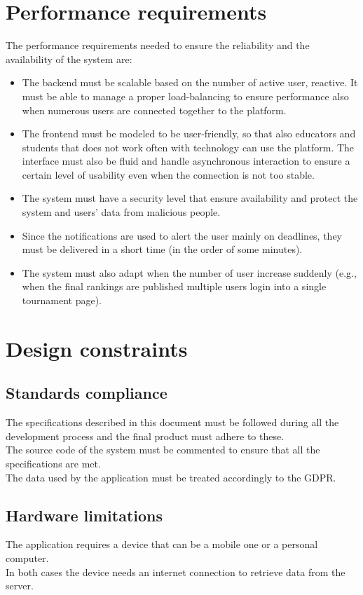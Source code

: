 \documentclass[12pt, a4paper]{report}
\begin{document}
    \section{Performance requirements}
    The performance requirements needed to ensure the reliability and the availability of the system are: 
    \begin{itemize}
        \item The backend must be scalable based on the number of active user, reactive. 
            It must be able to manage a proper load-balancing to ensure performance also when numerous users are connected together to the platform. 
        \item The frontend must be modeled to be user-friendly, so that also educators and students that does not work often with technology can use the platform. 
            The interface must also be fluid and handle asynchronous interaction to ensure a certain level of usability even when the connection is not too stable. 
        \item The system must have a security level that ensure availability and protect the system and users' data from malicious people. 
        \item Since the notifications are used to alert the user mainly on deadlines, they must be delivered in a short time (in the order of some minutes). 
        \item The system must also adapt when the number of user increase suddenly (e.g., when the final rankings are published multiple users login into a single tournament page). 
    \end{itemize}

    \section{Design constraints}

    \subsection{Standards compliance}
    The specifications described in this document must be followed during all the development process and the final product must adhere to these. \\
    The source code of the system must be commented to ensure that all the specifications are met. \\
    The data used by the application must be treated accordingly to the GDPR. 

    \subsection{Hardware limitations}
    The application requires a device that can be a mobile one or a personal computer. \\
    In both cases the device needs an internet connection to retrieve data from the server. 
\end{document}
